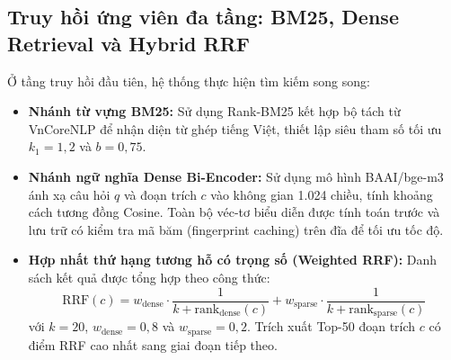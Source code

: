 \documentclass[12pt,a4paper]{article}
\begin{document}
\subsection{Truy hồi ứng viên đa tầng: BM25, Dense Retrieval và Hybrid RRF}
Ở tầng truy hồi đầu tiên, hệ thống thực hiện tìm kiếm song song:
\begin{itemize}[leftmargin=0.7cm]
    \item \textbf{Nhánh từ vựng BM25:} Sử dụng Rank-BM25 kết hợp bộ tách từ VnCoreNLP \cite{vu2018vncorenlp} để nhận diện từ ghép tiếng Việt, thiết lập siêu tham số tối ưu $k_1 = 1,2$ và $b = 0,75$.
    \item \textbf{Nhánh ngữ nghĩa Dense Bi-Encoder:} Sử dụng mô hình BAAI/bge-m3 \cite{chen2024bge} ánh xạ câu hỏi $q$ và đoạn trích $c$ vào không gian 1.024 chiều, tính khoảng cách tương đồng Cosine. Toàn bộ véc-tơ biểu diễn được tính toán trước và lưu trữ có kiểm tra mã băm (fingerprint caching) trên đĩa để tối ưu tốc độ.
    \item \textbf{Hợp nhất thứ hạng tương hỗ có trọng số (Weighted RRF):} Danh sách kết quả được tổng hợp theo công thức:
    \begin{equation}
    \text{RRF}(c) = w_{\text{dense}} \cdot \frac{1}{k + \text{rank}_{\text{dense}}(c)} + w_{\text{sparse}} \cdot \frac{1}{k + \text{rank}_{\text{sparse}}(c)}
    \label{eq:weighted_rrf}
    \end{equation}
    với $k = 20$, $w_{\text{dense}} = 0,8$ và $w_{\text{sparse}} = 0,2$. Trích xuất Top-50 đoạn trích $c$ có điểm RRF cao nhất sang giai đoạn tiếp theo.
\end{itemize}
\end{document}
